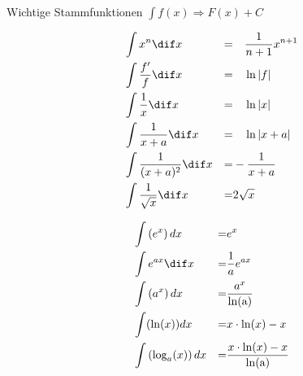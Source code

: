 \begin{center}
\begin{center}
        \begin{highlight}{Wichtige Stammfunktionen}
            $\int f(x) \Longrightarrow F(x) + C$
        \begin{center}
            \begin{minipage}{0.45\linewidth}
                \begin{align*}
                    &\int x^n \dif x  &=&  \quad \frac{1}{n+1}x^{n+1}  \\
                    &\int \frac{f'}{f} \dif x  &=&  \quad \ln \left\lvert f \right\rvert  \\
                    &\int \frac{1}{x} \dif x  &=& \quad \ln \left\lvert x \right\rvert  \\
                    &\int \frac{1}{x+a} \dif x  &=&  \quad \ln \left\lvert x+a \right\rvert \\
                    &\int \frac{1}{(x+a)^2} \dif x  &=&  -\frac{1}{x+a}  \\
                    &\int \frac{1}{\sqrt{x}}\dif x  &=&  2 \sqrt{x}  \\
                \end{align*}
            \end{minipage}
            \hfill\vline\hfill
            \begin{minipage}{0.45\linewidth}
                \begin{align*}
                    &\int\left(e^{x}\right) d x  &=& e^{x} \\
                    &\int e^{ax} \dif x  &=&  \frac{1}{a} e^{ax}  \\
                    &\int\left(a^{x}\right) d x \quad  &=& \frac{a^{x}}{\ln (\mathrm{a})} \\
                    &\int(\ln (x)) d x  &=& x \cdot \ln (x)-x \\
                    &\int\left(\log _{a}(x)\right) d x  &=& \frac{x \cdot \ln (x)-x}{\ln (\mathrm{a})} \\
                \end{align*}
            \end{minipage}
        \end{center}
        \begin{center}
            \begin{minipage}{0.4\linewidth}
                    \begin{align*}

\end{align*}
\end{minipage}
\end{center}
\end{highlight}
\end{center}
\end{center}

